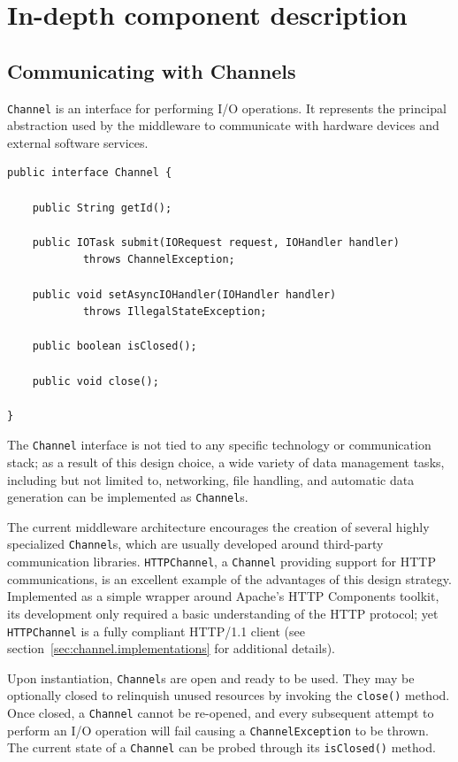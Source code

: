 \chapter{In-depth component description}

\section{Communicating with Channels}
\label{sec:channel}

\texttt{Channel} is an interface for performing I/O operations. It represents
the principal abstraction used by the middleware to communicate with hardware
devices and external software services.

\lstset{language=Java}
\begin{lstlisting}[float,caption=The Channel interface,label={lst:channel}]
public interface Channel {

	public String getId();
	
	public IOTask submit(IORequest request, IOHandler handler)
			throws ChannelException;
	
	public void setAsyncIOHandler(IOHandler handler)
			throws IllegalStateException;
			
	public boolean isClosed();
	
	public void close();
			
}
\end{lstlisting}

The \texttt{Channel} interface is not tied to any specific technology or
communication stack; as a result of this design choice, a wide variety of data
management tasks, including but not limited to, networking, file handling, and
automatic data generation can be implemented as \texttt{Channel}s.

The current middleware architecture encourages the creation of several highly
specialized \texttt{Channel}s, which are usually developed around third-party
communication libraries. \texttt{HTTPChannel}, a \texttt{Channel} providing
support for HTTP communications, is an excellent example of the advantages of
this design strategy. Implemented as a simple wrapper around Apache's HTTP
Components toolkit, its development only required a basic understanding of the
HTTP protocol; yet \texttt{HTTPChannel} is a fully compliant HTTP/1.1 client
(see section~\ref{sec:channel.implementations} for additional details).

Upon instantiation, \texttt{Channel}s are open and ready to be used. They may
be optionally closed to relinquish unused resources by invoking the
\texttt{close()} method. Once closed, a \texttt{Channel} cannot be re-opened,
and every subsequent attempt to perform an I/O operation will fail causing a
\texttt{ChannelException} to be thrown. The current state of a \texttt{Channel}
can be probed through its \texttt{isClosed()} method.

